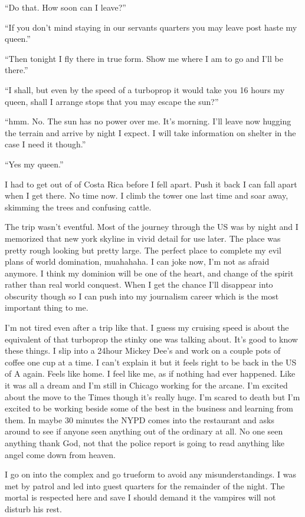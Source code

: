 ``Do that. How soon can I leave?''

``If you don't mind staying in our servants quarters you may leave post haste my queen.''

``Then tonight I fly there in true form. Show me where I am to go and I'll be there.''

``I shall, but even by the speed of a turboprop it would take you 16 hours my queen, shall I arrange stops that you may escape the sun?''

``hmm. No. The sun has no power over me. It's morning. I'll leave now hugging the terrain and arrive by night I expect. I will take information on shelter in the case I need it though.''

``Yes my queen.''

I had to get out of of Costa Rica before I fell apart. Push it back I can fall apart when I get there. No time now. I climb the tower one last time and soar away, skimming the trees and confusing cattle.

The trip wasn't eventful. Most of the journey through the US was by night and I memorized that new york skyline in vivid detail for use later. The place was pretty rough looking but pretty large. The perfect place to complete my evil plans of world domination, muahahaha. I can joke now, I'm not as afraid anymore. I think my dominion will be one of the heart, and change of the spirit rather than real world conquest. When I get the chance I'll disappear into obscurity though so I can push into my journalism career which is the most important thing to me.

I'm not tired even after a trip like that. I guess my cruising speed is about the equivalent of that turboprop the stinky one was talking about. It's good to know these things. I slip into a 24hour Mickey Dee's and work on a couple pots of coffee one cup at a time. I can't explain it but it feels right to be back in the US of A again. Feels like home. I feel like me, as if nothing had ever happened. Like it was all a dream and I'm still in Chicago working for the arcane. I'm excited about the move to the Times though it's really huge. I'm scared to death but I'm excited to be working beside some of the best in the business and learning from them.
In maybe 30 minutes the NYPD comes into the restaurant and asks around to see if anyone seen anything out of the ordinary at all. No one seen anything thank God, not that the police report is going to read anything like angel come down from heaven.

I go on into the complex and go trueform to avoid any misunderstandings. I was met by patrol and led into guest quarters for the remainder of the night. The mortal is respected here and save I should demand it the vampires will not disturb his rest.

